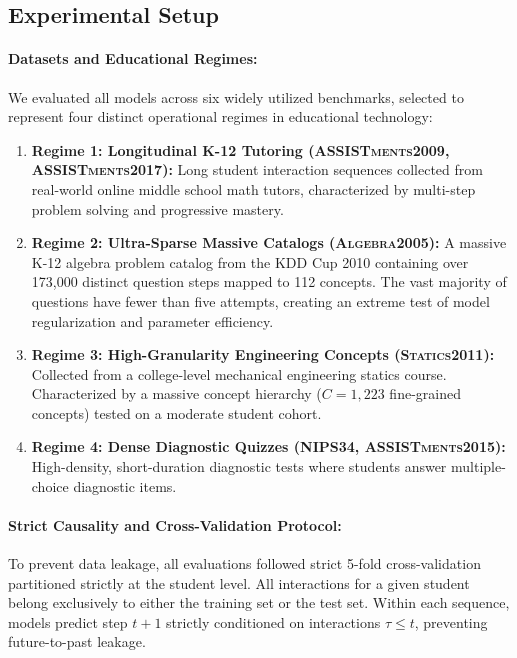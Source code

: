 \documentclass[11pt]{article}
\begin{document}
\subsection{Experimental Setup}

\paragraph{Datasets and Educational Regimes:}
We evaluated all models across six widely utilized benchmarks, selected to represent four distinct operational regimes in educational technology:
\begin{enumerate}
    \item \textbf{Regime 1: Longitudinal K-12 Tutoring (\textsc{ASSISTments2009}, \textsc{ASSISTments2017}):} Long student interaction sequences collected from real-world online middle school math tutors, characterized by multi-step problem solving and progressive mastery.
    \item \textbf{Regime 2: Ultra-Sparse Massive Catalogs (\textsc{Algebra2005}):} A massive K-12 algebra problem catalog from the KDD Cup 2010 containing over 173,000 distinct question steps mapped to 112 concepts. The vast majority of questions have fewer than five attempts, creating an extreme test of model regularization and parameter efficiency.
    \item \textbf{Regime 3: High-Granularity Engineering Concepts (\textsc{Statics2011}):} Collected from a college-level mechanical engineering statics course. Characterized by a massive concept hierarchy ($C = 1,223$ fine-grained concepts) tested on a moderate student cohort.
    \item \textbf{Regime 4: Dense Diagnostic Quizzes (\textsc{NIPS34}, \textsc{ASSISTments2015}):} High-density, short-duration diagnostic tests where students answer multiple-choice diagnostic items.
\end{enumerate}

\paragraph{Strict Causality and Cross-Validation Protocol:}
To prevent data leakage, all evaluations followed strict 5-fold cross-validation partitioned strictly at the student level. All interactions for a given student belong exclusively to either the training set or the test set. Within each sequence, models predict step $t+1$ strictly conditioned on interactions $\tau \le t$, preventing future-to-past leakage.
\end{document}

